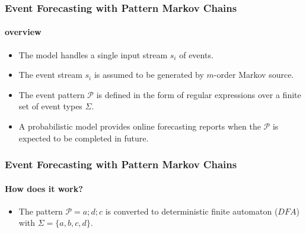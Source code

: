 \frame
{
  \frametitle{ Event Forecasting with Pattern Markov
 	Chains \cite{alevizos2017event} }
	\framesubtitle{overview}
  \begin{itemize}[]
  	\item<1-> The model handles a single input stream $s_i$ of events.
  	\item<1-> The event stream $s_i$ is assumed to be generated by $m$-order Markov source.
  \item<1-> The  event pattern $\mathcal{P}$ is defined in the form of regular expressions over a finite set of event types $\Sigma$.

  \item<1-> A probabilistic model provides online forecasting reports when the $\mathcal{P}$ is expected to be completed in future. 
   
  \end{itemize}
}

\frame
{
	\frametitle{Event Forecasting with Pattern Markov
		Chains  }
	\framesubtitle{ How does it work?}
		\begin{itemize}
		\item<only@1> The pattern $\mathcal{P}=a ; d ; c$ is converted to deterministic finite automaton ($DFA$) with $\Sigma=\{a,b,c,d\}$. 
		
	
			\end{itemize}
}

